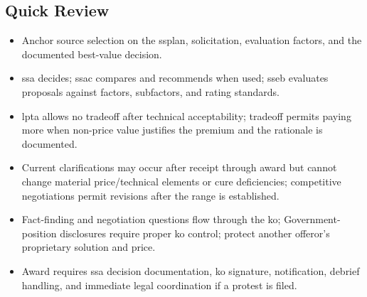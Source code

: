 \documentclass[../main.tex]{subfiles}
\begin{document}
\subsection{Quick Review}
\begin{itemize}
  \item Anchor source selection on the \ac{ssplan}, solicitation, evaluation factors, and the documented best-value decision.
  \item \ac{ssa} decides; \ac{ssac} compares and recommends when used; \ac{sseb} evaluates proposals against factors, subfactors, and rating standards.
  \item \ac{lpta} allows no tradeoff after technical acceptability; tradeoff permits paying more when non-price value justifies the premium and the rationale is documented.
  \item Current clarifications may occur after receipt through award but cannot change material price/technical elements or cure deficiencies; competitive negotiations permit revisions after the range is established.
  \item Fact-finding and negotiation questions flow through the \ac{ko}; Government-position disclosures require proper \ac{ko} control; protect another offeror's proprietary solution and price.
  \item Award requires \ac{ssa} decision documentation, \ac{ko} signature, notification, debrief handling, and immediate legal coordination if a protest is filed.
\end{itemize}

\end{document}
